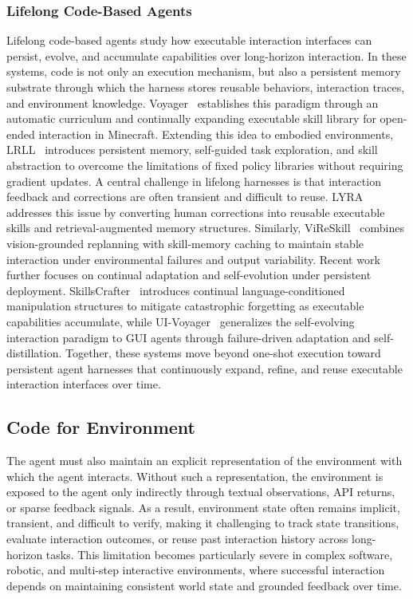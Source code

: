 \subsubsection{Lifelong Code-Based Agents}
Lifelong code-based agents study how executable interaction
interfaces can persist, evolve, and accumulate capabilities over
long-horizon interaction.
In these systems, code is not only an execution mechanism, but
also a persistent memory substrate through which the harness
stores reusable behaviors, interaction traces, and environment
knowledge.
Voyager~\cite{wang2023voyager} establishes this paradigm through
an automatic curriculum and continually expanding executable
skill library for open-ended interaction in Minecraft.
Extending this idea to embodied environments,
LRLL~\cite{tziafas2024lifelong} introduces persistent memory,
self-guided task exploration, and skill abstraction to overcome
the limitations of fixed policy libraries without requiring
gradient updates.
A central challenge in lifelong harnesses is that interaction
feedback and corrections are often transient and difficult to
reuse.
LYRA~\cite{meng2025growing} addresses this issue by converting
human corrections into reusable executable skills and
retrieval-augmented memory structures.
Similarly, ViReSkill~\cite{kagaya2025vireskill} combines
vision-grounded replanning with skill-memory caching to maintain
stable interaction under environmental failures and output
variability.
Recent work further focuses on continual adaptation and
self-evolution under persistent deployment.
SkillsCrafter~\cite{wang2026lifelong} introduces continual
language-conditioned manipulation structures to mitigate
catastrophic forgetting as executable capabilities accumulate,
while UI-Voyager~\cite{lin2026ui} generalizes the self-evolving
interaction paradigm to GUI agents through failure-driven
adaptation and self-distillation.
Together, these systems move beyond one-shot execution toward
persistent agent harnesses that continuously expand, refine, and
reuse executable interaction interfaces over time.

\subsection{Code for Environment}
\label{subsec:environment}


The agent must also maintain an explicit representation
of the environment with which the agent interacts.
Without such a representation, the environment is exposed to the agent only indirectly through textual observations, API returns, or sparse feedback signals.
As a result, environment state often remains implicit, transient, and difficult to verify, making it challenging to
track state transitions, evaluate interaction outcomes, or reuse
past interaction history across long-horizon tasks.
This limitation becomes particularly severe in complex software,
robotic, and multi-step interactive environments, where
successful interaction depends on maintaining consistent world
state and grounded feedback over time.


